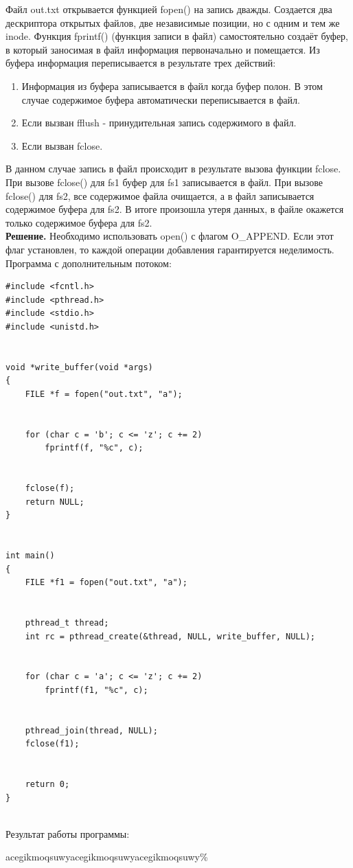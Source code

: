 Файл out.txt открывается функцией fopen() на запись дважды. Создается два
дескриптора открытых файлов, две независимые позиции, но с одним и тем же
inode. Функция fprintf() (функция записи в файл) самостоятельно создаёт буфер,
в который заносимая в файл информация первоначально и помещается. Из буфера
информация переписывается в результате трех действий:
\begin{enumerate}
  \item Информация из буфера записывается в файл когда буфер полон. В
        этом случае содержимое буфера автоматически переписывается в файл.
  \item Если вызван fflush - принудительная запись содержимого в файл.
  \item Если вызван fclose.
\end{enumerate}
В данном случае запись в файл происходит в результате вызова функции fclose.
При вызове fclose() для fs1 буфер для fs1 записывается в файл. При вызове
fclose() для fs2, все содержимое файла очищается, а в файл записывается
содержимое буфера для fs2. В итоге произошла утеря данных, в файле окажется
только содержимое буфера для fs2. \\
\textbf{Решение.} Необходимо использовать open() с флагом O\_APPEND. Если этот
флаг установлен, то каждой операции добавления гарантируется неделимость. \\
Программа с дополнительным потоком:\newpage
\begin{lstlisting}
#include <fcntl.h>
#include <pthread.h>
#include <stdio.h>
#include <unistd.h>


void *write_buffer(void *args)
{
    FILE *f = fopen("out.txt", "a");


    for (char c = 'b'; c <= 'z'; c += 2)
        fprintf(f, "%c", c);


    fclose(f);
    return NULL;
}


int main()
{
    FILE *f1 = fopen("out.txt", "a");


    pthread_t thread;
    int rc = pthread_create(&thread, NULL, write_buffer, NULL);


    for (char c = 'a'; c <= 'z'; c += 2)
        fprintf(f1, "%c", c);


    pthread_join(thread, NULL);
    fclose(f1);


    return 0;
}
  
\end{lstlisting}
Результат работы программы:

acegikmoqsuwyacegikmoqsuwyacegikmoqsuwy\%


